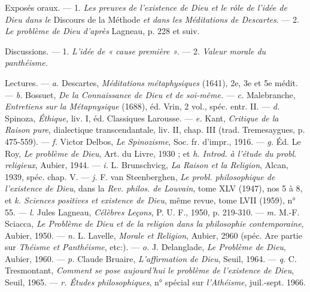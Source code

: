 Exposés oraux. — 1. {\it Les preuves de l'existence de Dieu et le rôle de l'idée
de Dieu dans le} Discours de la Méthode {\it et dans les Méditations de Descartes}.
— 2. {\it Le problème de Dieu d'après} Lagneau, p. 228 et suiv.

Discussions. — 1. {\it L'idée de « cause première ».} — 2. {\it Valeur morale du
panthéisme.}

Lectures. — {\it a.} Descartes, {\it Méditations métaphysiques} (1641), 2e, 3e et
5e médit. — {\it b.} Bossuet, {\it De la Connaissance de Dieu et de soi-même.} —
{\it c.} Malebranche, {\it Entretiens sur la Métapnysique} (1688), éd. Vrin, 2 vol.,
spéc. entr. II. — {\it d.} Spinoza, {\it Éthique,} liv. I, éd. Classiques Larousse. —
{\it e.} Kant, {\it Critique de la Raison pure}, dialectique transcendantale, liv. II,
chap. III (trad. Tremesaygues, p. 475-559). — {\it f.} Victor Delbos, {\it Le Spinozisme},
Soc. fr. d’impr., 1916. — {\it g.} Éd. Le Roy, {\it Le problème de Dieu}, Art.
du Livre, 1930 ; et {\it h. Introd. à l'étude du probl. religieux}, Aubier, 1944. —
{\it i.} L. Brunschvicg, {\it La Raison et la Religion}, Alcan, 1939, spéc. chap. V. —
{\it j.} F. van Steenberghen, {\it Le probl. philosophique de l'existence de Dieu}, dans
la {\it Rev. philos. de Louvain}, tome XLV (1947), nos 5 à 8, et {\it k. Sciences positives
et existence de Dieu}, même revue, tome LVII (1959), n° 55. — {\it l.} Jules
Lagneau, {\it Célèbres Leçons}, P. U. F., 1950, p. 219-310. — {\it m.} M.-F. Sciacca,
{\it Le Problème de Dieu et de la religion dans la philosophie contemporaine},
Aubier, 1950. — {\it n.} L. Lavelle, {\it Morale et Religion}, Aubier, 2960 (spéc.
Are partie sur {\it Théisme et Panthéisme}, etc:). — {\it o.} J. Delanglade, {\it Le Problème
de Dieu}, Aubier, 1960. — {\it p.} Claude Bruaire, {\it L'affirmation de Dieu},
Seuil, 1964. — {\it q.} C. Tresmontant, {\it Comment se pose aujourd’hui le problème
de l'existence de Dieu}, Seuil, 1965. — {\it r. Études philosophiques}, n° spécial sur
{\it l’Athéisme}, juil.-sept. 1966.
